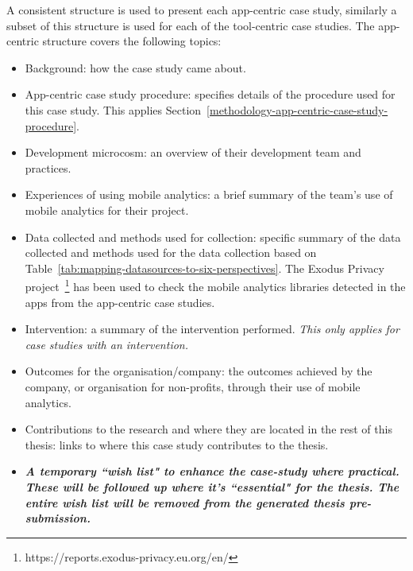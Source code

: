 A consistent structure is used to present each app-centric case study, similarly a subset of this structure is used for each of the tool-centric case studies. 
The app-centric structure covers the following topics:
\begin{itemize}
    \itemsep0em
    \item Background: how the case study came about.
    \item App-centric case study procedure: specifies details of the procedure used for this case study. This applies Section~\ref{methodology-app-centric-case-study-procedure}.
    \item Development microcosm: an overview of their development team and practices.
    \item Experiences of using mobile analytics: a brief summary of the team's use of mobile analytics for their project.
    \item Data collected and methods used for collection: specific summary of the data collected and methods used for the data collection based on Table~\ref{tab:mapping-datasources-to-six-perspectives}. The Exodus Privacy project~\footnote{https://reports.exodus-privacy.eu.org/en/} has been used to check the mobile analytics libraries detected in the apps from the app-centric case studies. 
    \item Intervention: a summary of the intervention performed. \textit{This only applies for case studies with an intervention.}
    \item Outcomes for the organisation/company: the outcomes achieved by the company, or organisation for non-profits, through their use of mobile analytics.
    \item Contributions to the research and where they are located in the rest of this thesis: links to where this case study contributes to the thesis.
    \item \textbf{\textit{A temporary ``wish list" to enhance the case-study where practical. These will be followed up where it's ``essential" for the thesis. The entire wish list will be removed from the generated thesis pre-submission.}}
\end{itemize}

\clearpage





